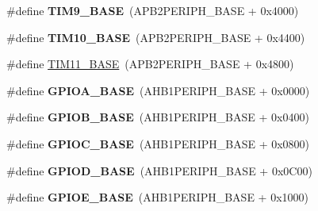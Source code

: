 \begin{DoxyCompactItemize}
\item 
\hypertarget{group___peripheral__memory__map_ga92ae902be7902560939223dd765ece08}{\#define {\bfseries T\-I\-M9\-\_\-\-B\-A\-S\-E}~(A\-P\-B2\-P\-E\-R\-I\-P\-H\-\_\-\-B\-A\-S\-E + 0x4000)}\label{group___peripheral__memory__map_ga92ae902be7902560939223dd765ece08}

\item 
\hypertarget{group___peripheral__memory__map_ga3eff32f3801db31fb4b61d5618cad54a}{\#define {\bfseries T\-I\-M10\-\_\-\-B\-A\-S\-E}~(A\-P\-B2\-P\-E\-R\-I\-P\-H\-\_\-\-B\-A\-S\-E + 0x4400)}\label{group___peripheral__memory__map_ga3eff32f3801db31fb4b61d5618cad54a}

\item 
\#define \hyperlink{group___peripheral__memory__map_ga3a4a06bb84c703084f0509e105ffaf1d}{T\-I\-M11\-\_\-\-B\-A\-S\-E}~(A\-P\-B2\-P\-E\-R\-I\-P\-H\-\_\-\-B\-A\-S\-E + 0x4800)
\item 
\hypertarget{group___peripheral__memory__map_gad7723846cc5db8e43a44d78cf21f6efa}{\#define {\bfseries G\-P\-I\-O\-A\-\_\-\-B\-A\-S\-E}~(A\-H\-B1\-P\-E\-R\-I\-P\-H\-\_\-\-B\-A\-S\-E + 0x0000)}\label{group___peripheral__memory__map_gad7723846cc5db8e43a44d78cf21f6efa}

\item 
\hypertarget{group___peripheral__memory__map_gac944a89eb789000ece920c0f89cb6a68}{\#define {\bfseries G\-P\-I\-O\-B\-\_\-\-B\-A\-S\-E}~(A\-H\-B1\-P\-E\-R\-I\-P\-H\-\_\-\-B\-A\-S\-E + 0x0400)}\label{group___peripheral__memory__map_gac944a89eb789000ece920c0f89cb6a68}

\item 
\hypertarget{group___peripheral__memory__map_ga26f267dc35338eef219544c51f1e6b3f}{\#define {\bfseries G\-P\-I\-O\-C\-\_\-\-B\-A\-S\-E}~(A\-H\-B1\-P\-E\-R\-I\-P\-H\-\_\-\-B\-A\-S\-E + 0x0800)}\label{group___peripheral__memory__map_ga26f267dc35338eef219544c51f1e6b3f}

\item 
\hypertarget{group___peripheral__memory__map_ga1a93ab27129f04064089616910c296ec}{\#define {\bfseries G\-P\-I\-O\-D\-\_\-\-B\-A\-S\-E}~(A\-H\-B1\-P\-E\-R\-I\-P\-H\-\_\-\-B\-A\-S\-E + 0x0\-C00)}\label{group___peripheral__memory__map_ga1a93ab27129f04064089616910c296ec}

\item 
\hypertarget{group___peripheral__memory__map_gab487b1983d936c4fee3e9e88b95aad9d}{\#define {\bfseries G\-P\-I\-O\-E\-\_\-\-B\-A\-S\-E}~(A\-H\-B1\-P\-E\-R\-I\-P\-H\-\_\-\-B\-A\-S\-E + 0x1000)}\label{group___peripheral__memory__map_gab487b1983d936c4fee3e9e88b95aad9d}


\end{DoxyCompactItemize}
